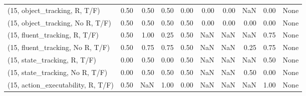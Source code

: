 \begin{table*}[h!]
\begin{adjustbox}{width=2\columnwidth,center}
\begin{tabular}{lrrr|rrr|rrr}
\midrule
(15, object\_tracking, R, T/F)         &                      0.50 &                  0.50 &                      0.50 &                          0.00 &                      0.00 &                          0.00 &                                    NaN &                               0.00 &                                  None \\
(15, object\_tracking, No R, T/F)      &                      0.50 &                  0.50 &                      0.50 &                          0.50 &                      0.00 &                          0.00 &                                   0.00 &                               0.00 &                                  None \\
(15, fluent\_tracking, R, T/F)         &                      0.50 &                  1.00 &                      0.25 &                          0.50 &                       NaN &                           NaN &                                    NaN &                               0.75 &                                  None \\
(15, fluent\_tracking, No R, T/F)      &                      0.50 &                  0.75 &                      0.75 &                          0.50 &                       NaN &                           NaN &                                   0.25 &                               0.75 &                                  None \\
(15, state\_tracking, R, T/F)          &                      0.00 &                  0.50 &                      0.00 &                          0.50 &                       NaN &                           NaN &                                    NaN &                               0.50 &                                  None \\
(15, state\_tracking, No R, T/F)       &                      0.00 &                  0.50 &                      0.50 &                          0.50 &                       NaN &                           NaN &                                   0.50 &                               0.00 &                                  None \\
(15, action\_executability, R, T/F)    &                      0.50 &                   NaN &                      1.00 &                          0.00 &                       NaN &                           NaN &                                    NaN &                               1.00 &                                  None \\

\end{tabular}
\end{adjustbox}
\end{table*}
